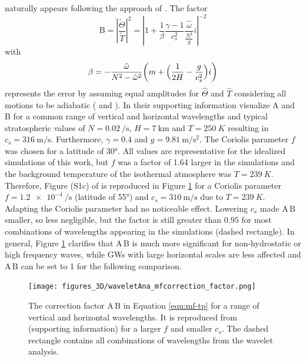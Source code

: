 naturally appears following the approach of \textcite[]{ern_absolute_2004}. The factor
\begin{equation}
    \textrm{B} = \left| \frac{\tilde{\Theta}}{\tilde{T}} \right|^2 = \left| 1 + \frac{1}{\beta} \frac{\gamma-1}{c_s^2} \frac{\hat{\omega}}{\frac{N^2}{g}}i\right|^{-2}
    \label{equ:B}
\end{equation}
with
\begin{equation}
    \beta = -\frac{\hat{\omega}}{N^2-\hat{\omega}^2} \biggl(m + \Bigl(\frac{1}{2H}-\frac{g}{c_s^2}\Bigr)i\biggr)
    \label{equ:beta}
\end{equation}
represents the error by assuming equal amplitudes for $\hat{\Theta}$ and $\hat{T}$ considering all motions to be adiabatic (\cite[]{fritts_gravity_2003} and \cite[]{ern_directional_2017}). In their supporting information \textcite[]{ern_directional_2017} visualize A and B for a common range of vertical and horizontal wavelengths and typical stratospheric values of $N=\SI{0.02}{\per\second}$, $H=\SI{7}{\kilo\meter}$ and $T=\SI{250}{K}$ resulting in $c_s = \SI{316}{\meter\per\second}$. Furthermore, $\gamma=0.4$ and $g=\SI{9.81}{\meter\per\second^2}$. The Coriolis parameter $f$ was chosen for a latitude of 30°. All values are representative for the idealized simulations of this work, but $f$ was a factor of 1.64 larger in the simulations and the background temperature of the isothermal atmosphere was $T=\SI{239}{K}$. Therefore, Figure (S1c) of \textcite[]{ern_directional_2017} is reproduced in Figure \ref{fig:mf_correction} for a Coriolis parameter $f=\SI{1.2e-4}{\per\second}$ (latitude of 55°) and $c_s = \SI{310}{\meter\per\second}$ due to $T=\SI{239}{K}$. \\
Adapting the Coriolis parameter had no noticeable effect. Lowering $c_s$ made $\textrm{A} \, \textrm{B}$ smaller, so less negligible, but the factor is still greater than $0.95$ for most combinations of wavelengths appearing in the simulations (dashed rectangle). In general, Figure \ref{fig:mf_correction} clarifies that $\textrm{A} \, \textrm{B}$ is much more significant for non-hydrostatic or high frequency waves, while GWs with large horizontal scales are less affected and $\textrm{A} \, \textrm{B}$ can be set to 1 for the following comparison.
\begin{figure}
    \texttt{[image: figures\_3D/waveletAna\_mfcorrection\_factor.png]}
    \caption{The correction factor $\textrm{A} \, \textrm{B}$ in Equation \ref{equ:mf-tp} for a range of vertical and horizontal wavelengths. It is reproduced from \textcite[]{ern_directional_2017} (supporting information) for a larger $f$ and smaller $c_s$. The dashed rectangle contains all combinations of wavelengths from the wavelet analysis.}
    \label{fig:mf_correction}
\end{figure}

